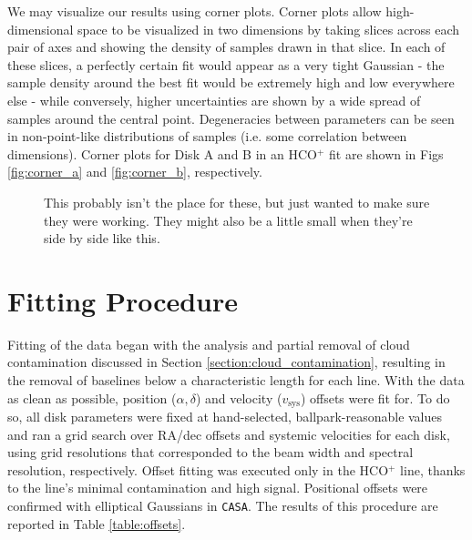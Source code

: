 We may visualize our results using corner plots. Corner plots allow high-dimensional space to be visualized in two dimensions by taking slices across each pair of axes and showing the density of samples drawn in that slice. In each of these slices, a perfectly certain fit would appear as a very tight Gaussian - the sample density around the best fit would be extremely high and low everywhere else - while conversely, higher uncertainties are shown by a wide spread of samples around the central point. Degeneracies between parameters can be seen in non-point-like distributions of samples (i.e. some correlation between dimensions). Corner plots for Disk A and B in an HCO$^+$ fit are shown in Figs \ref{fig:corner_a} and \ref{fig:corner_b}, respectively.


\begin{figure}[htp]
  \hspace*{\fill}%
  \hfill%
  \hspace*{\fill}%
  \caption{This probably isn't the place for these, but just wanted to make sure they were working. They might also be a little small when they're side by side like this.}
  \label{fig:corner_plots}
\end{figure}





\section{Fitting Procedure}
\label{section:fitting_procedure}

Fitting of the data began with the analysis and partial removal of cloud contamination discussed in Section \ref{section:cloud_contamination}, resulting in the removal of baselines below a characteristic length for each line. With the data as clean as possible, position ($\alpha, \delta$) and velocity ($v_\text{sys}$) offsets were fit for. To do so, all disk parameters were fixed at hand-selected, ballpark-reasonable values and ran a grid search over RA/dec offsets and systemic velocities for each disk, using grid resolutions that corresponded to the beam width and spectral resolution, respectively. Offset fitting was executed only in the HCO$^+$ line, thanks to the line's minimal contamination and high signal. Positional offsets were confirmed with elliptical Gaussians in \texttt{CASA}. The results of this procedure are reported in Table \ref{table:offsets}.

